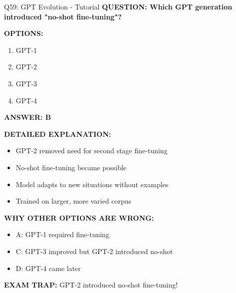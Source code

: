 \documentclass[8pt]{beamer}
\begin{document}
	\begin{frame}{Q59: GPT Evolution - Tutorial}
		\fontsize{6.5}{7.5}\selectfont
		\textbf{QUESTION: Which GPT generation introduced "no-shot fine-tuning"?}
		
		\vspace{0.1cm}
		\textbf{OPTIONS:}
		\begin{enumerate}
			\item GPT-1
			\item GPT-2
			\item GPT-3
			\item GPT-4
		\end{enumerate}
		
		\vspace{0.1cm}
		\textcolor{myblue}{\textbf{ANSWER: B}}
		
		\vspace{0.1cm}
		\textbf{DETAILED EXPLANATION:}
		\begin{itemize}
			\item GPT-2 removed need for second stage fine-tuning
			\item No-shot fine-tuning became possible
			\item Model adapts to new situations without examples
			\item Trained on larger, more varied corpus
		\end{itemize}
		
		\vspace{0.1cm}
		\textcolor{myred}{\textbf{WHY OTHER OPTIONS ARE WRONG:}}
		\begin{itemize}
			\item \textcolor{myred}{A:} GPT-1 required fine-tuning
			\item \textcolor{myred}{C:} GPT-3 improved but GPT-2 introduced no-shot
			\item \textcolor{myred}{D:} GPT-4 came later
		\end{itemize}
		
		\textcolor{myred}{\textbf{EXAM TRAP:}} GPT-2 introduced \textcolor{myblue}{no-shot fine-tuning}!
	\end{frame}
	
\end{document}
